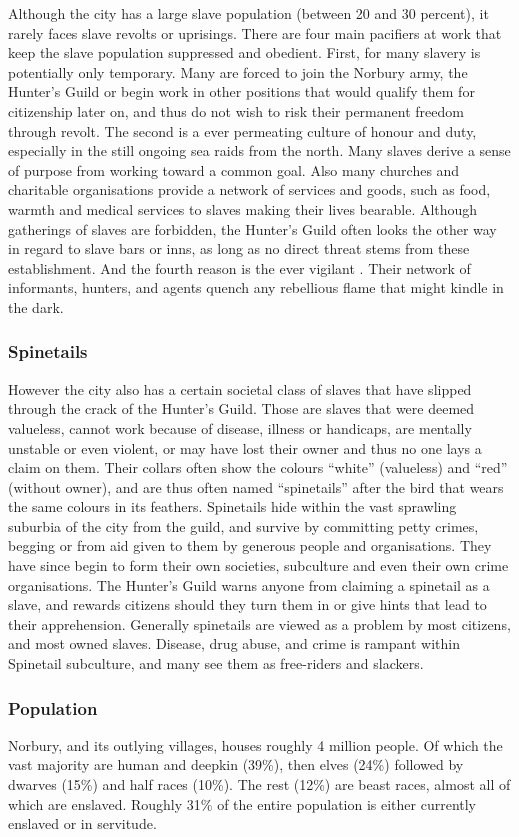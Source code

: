 Although the city has a large slave population (between 20 and 30 percent),
it rarely faces slave revolts or uprisings. There are four main pacifiers at
work that keep the slave population suppressed and obedient. First, for many
slavery is potentially only temporary. Many are forced to join the Norbury
army, the Hunter's Guild or begin work in other positions that would qualify
them for citizenship later on, and thus do not wish to risk their permanent
freedom through revolt. The second is a ever permeating culture of honour and
duty, especially in the still ongoing sea raids from the north. Many slaves
derive a sense of purpose from working toward a common goal. Also many
churches and charitable organisations provide a network of services and goods,
such as food, warmth and medical services to slaves making their lives
bearable. Although gatherings of slaves are forbidden, the Hunter's Guild
often looks the other way in regard to slave bars or inns, as long as no
direct threat stems from these establishment. And the fourth reason is the
ever vigilant . Their network of informants,
hunters, and agents quench any rebellious flame that might kindle in the dark.

\subsubsection{Spinetails}
\label{sec:Spinetails}

However the city also has a certain societal class of slaves that have slipped
through the crack of the Hunter's Guild. Those are slaves that were deemed
valueless, cannot work because of disease, illness or handicaps, are mentally
unstable or even violent, or may have lost their owner and thus no one lays a
claim on them. Their collars often show the colours ``white'' (valueless) and
``red'' (without owner), and are thus often named ``spinetails'' after the
bird that wears the same colours in its feathers. Spinetails hide within the
vast sprawling suburbia of the city from the guild, and survive by committing
petty crimes, begging or from aid given to them by generous people and
organisations. They have since begin to form their own societies, subculture
and even their own crime organisations. The Hunter's Guild warns anyone from
claiming a spinetail as a slave, and rewards citizens should they turn them in
or give hints that lead to their apprehension. Generally spinetails are viewed
as a problem by most citizens, and most owned slaves. Disease, drug abuse, and
crime is rampant within Spinetail subculture, and many see them as free-riders
and slackers.

\subsubsection{Population}

Norbury, and its outlying villages, houses roughly 4 million people. Of which
the vast majority are human and deepkin (39\%), then elves (24\%) followed by
dwarves (15\%) and half races (10\%). The rest (12\%) are beast races, almost
all of which are enslaved. Roughly 31\% of the entire population is either
currently enslaved or in servitude.
